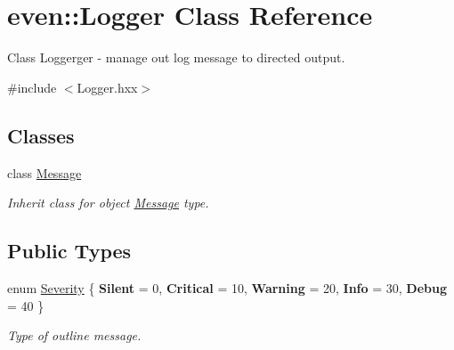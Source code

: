 \hypertarget{classeven_1_1_logger}{}\section{even\+:\+:Logger Class Reference}
\label{classeven_1_1_logger}


Class Loggerger -\/ manage out log message to directed output.  




{\ttfamily \#include $<$Logger.\+hxx$>$}

\subsection*{Classes}
\begin{DoxyCompactItemize}
\item 
class \mbox{\hyperlink{classeven_1_1_logger_1_1_message}{Message}}
\begin{DoxyCompactList}\small\item\em Inherit class for object \mbox{\hyperlink{classeven_1_1_logger_1_1_message}{Message}} type. \end{DoxyCompactList}\end{DoxyCompactItemize}
\subsection*{Public Types}
\begin{DoxyCompactItemize}
\item 
\mbox{\label{classeven_1_1_logger_adac430b7650d87ac25ace824917d66cf}} 
enum \mbox{\hyperlink{classeven_1_1_logger_adac430b7650d87ac25ace824917d66cf}{Severity}} \{ \newline
{\bfseries Silent} = 0, 
{\bfseries Critical} = 10, 
{\bfseries Warning} = 20, 
{\bfseries Info} = 30, 
\newline
{\bfseries Debug} = 40
 \}
\begin{DoxyCompactList}\small\item\em Type of outline message. \end{DoxyCompactList}\end{DoxyCompactItemize}
